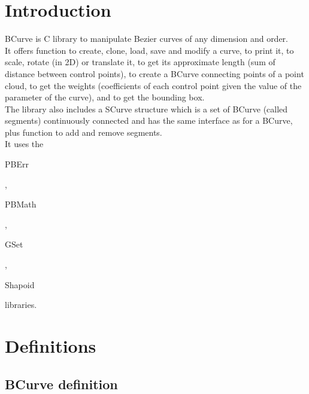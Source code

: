 \section*{Introduction}

BCurve is C library to manipulate Bezier curves of any dimension and order.\\ 

It offers function to create, clone, load, save and modify a curve, to print it, to scale, rotate (in 2D) or translate it, to get its approximate length (sum of distance between control points), to create a BCurve connecting points of a point cloud, to get the weights (coefficients of each control point given the value of the parameter of the curve), and to get the bounding box.\\ 

The library also includes a SCurve structure which is a set of BCurve (called segments) continuously connected and has the same interface as for a BCurve, plus function to add and remove segments.\\

It uses the \begin{ttfamily}PBErr\end{ttfamily}, \begin{ttfamily}PBMath\end{ttfamily}, \begin{ttfamily}GSet\end{ttfamily}, \begin{ttfamily}Shapoid\end{ttfamily} libraries.\\

\section{Definitions}

\subsection{BCurve definition}

